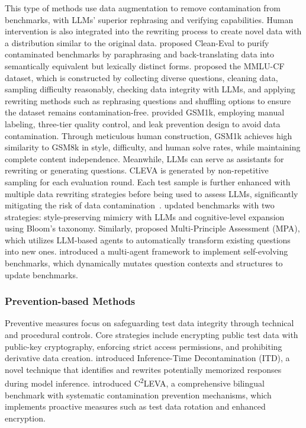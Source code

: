 This type of methods use data augmentation to remove contamination from benchmarks, with LLMs' superior rephrasing and verifying capabilities. Human intervention is also integrated into the rewriting process to create novel data with a distribution similar to the original data.
\citet{zhu-etal-2024-clean} proposed Clean-Eval to purify contaminated benchmarks by paraphrasing and back-translating data into semantically equivalent but lexically distinct forms.
\citet{zhao2024mmlu} proposed the MMLU-CF dataset, which is constructed by collecting diverse questions, cleaning data, sampling difficulty reasonably, checking data integrity with LLMs, and applying rewriting methods such as rephrasing questions and shuffling options to ensure the dataset remains contamination-free.
\citet{zhang2024careful} provided GSM1k, employing manual labeling, three-tier quality control, and leak prevention design to avoid data contamination. Through meticulous human construction, GSM1k achieves high similarity to GSM8k\cite{cobbe2021gsm8k} in style, difficulty, and human solve rates, while maintaining complete content independence.
Meanwhile, LLMs can serve as assistants for rewriting or generating questions. CLEVA is generated by non-repetitive sampling for each evaluation round. Each test sample is further enhanced with multiple data rewriting strategies before being used to assess LLMs, significantly mitigating the risk of data contamination~\citep{li-etal-2023-cleva}. \citet{ying2024automating} updated benchmarks with two strategies: style-preserving mimicry with LLMs and cognitive-level expansion using Bloom's taxonomy. Similarly, \citet{zhu2024dynamicevaluationlargelanguageMPA} proposed Multi-Principle Assessment (MPA), which utilizes LLM-based agents to automatically transform existing questions into new ones. \citet{wang2024benchmark} introduced a multi-agent framework to implement self-evolving benchmarks, which dynamically mutates question contexts and structures to update benchmarks.

\subsubsection{Prevention-based Methods}
Preventive measures focus on safeguarding test data integrity through technical and procedural controls. Core strategies include encrypting public test data with public-key cryptography, enforcing strict access permissions, and prohibiting derivative data creation. \citet{zhu2024inference} introduced Inference-Time Decontamination (ITD), a novel technique that identifies and rewrites potentially memorized responses during model inference. \citet{li2024c2levacomprehensivecontaminationfreelanguage} introduced C\textsuperscript{2}LEVA, a comprehensive bilingual benchmark with systematic contamination prevention mechanisms, which implements proactive measures such as test data rotation and enhanced encryption.

